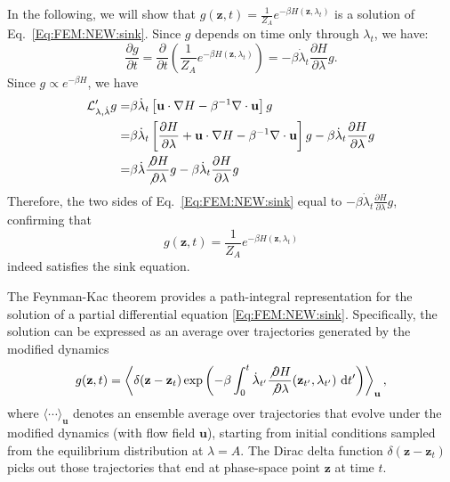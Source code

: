 In the following, we will show that $g(\mathbf{z},t) = \frac{1}{Z_A} e^{-\beta H(\mathbf{z},\lambda_t)}$ is a solution of Eq.~\ref{Eq:FEM:NEW:sink}. Since $g$ depends on time only through $\lambda_t$, we have:
\begin{equation}
	\frac{\partial g}{\partial t} = \frac{\partial}{\partial t} \left( \frac{1}{Z_A} e^{-\beta H(\mathbf{z},\lambda_t)} \right) = -\beta \dot{\lambda}_t \frac{\partial H}{\partial \lambda} g.
\end{equation}
Since $g \propto e^{-\beta H}$, we have
\begin{align}
	\mathcal{L}'_{\lambda,\dot{\lambda}} g = &\beta \dot{\lambda}_t \left[ \mathbf{u} \cdot \nabla H - \beta^{-1} \nabla \cdot \mathbf{u} \right] g\notag\\
	                                                                   = &\beta \dot{\lambda}_t \left[ \frac{\partial H}{\partial \lambda}+\mathbf{u} \cdot \nabla H - \beta^{-1} \nabla \cdot \mathbf{u} \right] g-\beta \dot{\lambda}_t \frac{\partial H}{\partial \lambda} g\notag\\
	                                                                   = &\beta \dot{\lambda} \frac{\not{\partial} H}{\not{\partial} \lambda} g - \beta \dot{\lambda}_t \frac{\partial H}{\partial \lambda} g
\end{align}
Therefore, the two sides of Eq.~\ref{Eq:FEM:NEW:sink} equal to $-\beta \dot{\lambda}_t \frac{\partial H}{\partial \lambda} g$, confirming that 
\begin{equation}
	g(\mathbf{z},t)= \frac{1}{Z_A} e^{-\beta H(\mathbf{z},\lambda_t)}\label{Eq:FEM:NEW:g}
\end{equation}
indeed satisfies the sink equation.

The Feynman-Kac theorem provides a path-integral representation for the solution of a partial differential equation \ref{Eq:FEM:NEW:sink}. Specifically, the solution can be expressed as an average over trajectories generated by the modified dynamics
\begin{equation}
	g(\mathbf{z},t) = \left\langle \delta(\mathbf{z} - \mathbf{z}_t) \exp\left( -\beta \int_0^t \dot{\lambda}_{t'} \frac{\not{\partial} H}{\not{\partial} \lambda}(\mathbf{z}_{t'},\lambda_{t'}) \, \mathop{}\!\mathrm{d} t' \right) \right\rangle_{\mathbf{u}},\label{Eq:FEM:NEW:Feynman-KacSolution}
\end{equation}
where $\langle \cdots \rangle_{\mathbf{u}}$ denotes an ensemble average over trajectories that evolve under the modified dynamics (with flow field $\mathbf{u}$), starting from initial conditions sampled from the equilibrium distribution at $\lambda = A$. The Dirac delta function $\delta(\mathbf{z} - \mathbf{z}_t)$ picks out those trajectories that end at phase-space point $\mathbf{z}$ at time $t$.

